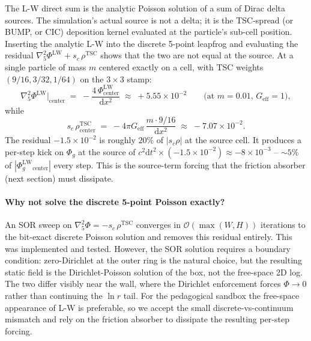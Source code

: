 \documentclass[11pt,a4paper]{article}
\newcommand{\Phig}{\Phi_g}
\newcommand{\order}[1]{\mathcal{O}(#1)}
\newcommand{\dd}{\mathrm{d}}
\begin{document}
The L-W direct sum is the analytic Poisson solution of a sum of Dirac
delta sources.  The simulation's actual source is not a delta; it is
the TSC-spread (or BUMP, or CIC) deposition kernel evaluated at the
particle's sub-cell position.  Inserting the analytic L-W into the
discrete 5-point leapfrog and evaluating the residual
$\nabla^2_5 \Phi^\text{LW} + s_c\,\rho^\text{TSC}$ shows that the two
are not equal at the source.  At a single particle of mass $m$
centered exactly on a cell, with TSC weights $(9/16, 3/32, 1/64)$ on
the $3 \times 3$ stamp:
\begin{equation}
  \nabla^2_5 \Phi^\text{LW}\bigr|_\text{center}
  \;=\;
  -\frac{4\,\Phi^\text{LW}_\text{center}}{\dd x^2}
  \;\approx\; +5.55 \times 10^{-2}
  \qquad\text{(at $m = 0.01$, $G_\text{eff}=1$)},
\end{equation}
while
\begin{equation}
  s_c\,\rho^\text{TSC}_\text{center}
  \;=\; -4\pi G_\text{eff}\,\frac{m \cdot 9/16}{\dd x^2}
  \;\approx\; -7.07 \times 10^{-2}.
\end{equation}
The residual $-1.5\times 10^{-2}$ is roughly $20\%$ of $|s_c\rho|$ at
the source cell.  It produces a per-step kick on $\Phig$ at the
source of $c^2\dd t^2 \times (-1.5\times 10^{-2}) \approx -8\times
10^{-3}$ -- $\sim 5\%$ of $|\Phig^\text{LW}_\text{center}|$ every
step.  This is the source-term forcing that the friction absorber
(next section) must dissipate.

\paragraph{Why not solve the discrete 5-point Poisson exactly?}  An
SOR sweep on $\nabla^2_5 \Phi = -s_c\,\rho^\text{TSC}$ converges in
$\order{\max(W,H)}$ iterations to the bit-exact discrete Poisson
solution and removes this residual entirely.  This was implemented
and tested.  However, the SOR solution requires a boundary
condition: zero-Dirichlet at the outer ring is the natural choice,
but the resulting static field is the Dirichlet-Poisson solution of
the box, not the free-space 2D log.  The two differ visibly near
the wall, where the Dirichlet enforcement forces $\Phi \to 0$ rather
than continuing the $\ln r$ tail.  For the pedagogical sandbox the
free-space appearance of L-W is preferable, so we accept the small
discrete-vs-continuum mismatch and rely on the friction absorber to
dissipate the resulting per-step forcing.

\end{document}
